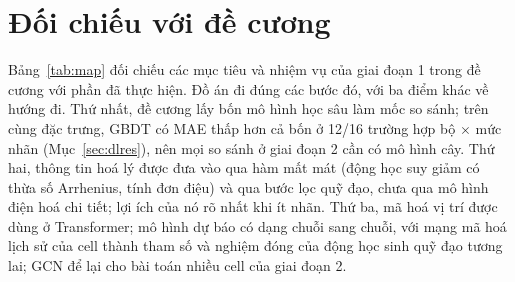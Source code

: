 \documentclass[12pt,a4paper,oneside]{report}
\theoremstyle{plain}
\theoremstyle{definition}
\begin{document}
\section{Đối chiếu với đề cương}\label{sec:map}

Bảng~\ref{tab:map} đối chiếu các mục tiêu và nhiệm vụ của giai đoạn 1 trong đề cương với phần đã thực hiện. Đồ án đi
đúng các bước đó, với ba điểm khác về hướng đi. Thứ nhất, đề cương lấy bốn mô
hình học sâu làm mốc so sánh; trên cùng đặc trưng, GBDT có MAE thấp hơn cả bốn ở 12/16 trường hợp bộ
$\times$ mức nhãn (Mục~\ref{sec:dlres}), nên mọi so sánh ở giai đoạn 2 cần có mô hình cây. Thứ hai, thông tin hoá lý
được đưa vào qua hàm mất mát (động học suy giảm có thừa số Arrhenius, tính đơn điệu) và qua bước lọc quỹ đạo, chưa qua
mô hình điện hoá chi tiết; lợi ích của nó rõ nhất khi ít nhãn. Thứ ba, mã hoá vị trí được dùng ở Transformer; mô hình
dự báo có dạng chuỗi sang chuỗi, với mạng mã hoá lịch sử của cell thành tham số và nghiệm đóng của động học sinh quỹ đạo
tương lai; GCN để lại cho bài toán nhiều cell của giai đoạn 2.
\end{document}
